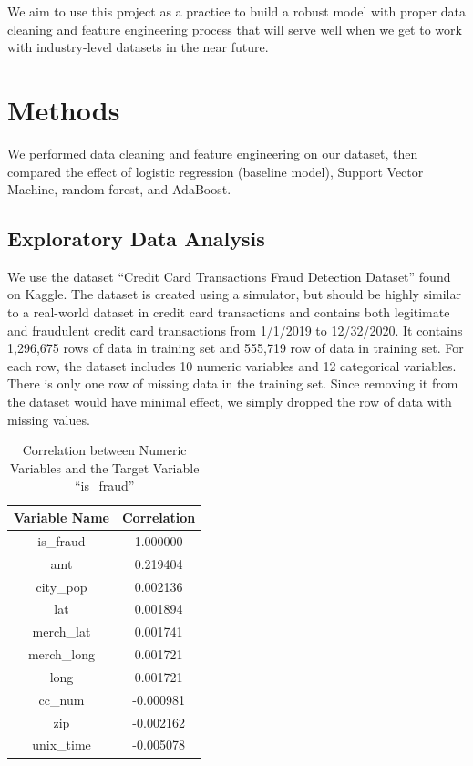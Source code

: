 \documentclass[sigconf, nonacm]{acmart}
\begin{document}
We aim to use this project as a practice to build a robust model with proper data cleaning and feature engineering process that will serve well when we get to work with industry-level datasets in the near future.


\section{Methods}
We performed data cleaning and feature engineering on our dataset, then compared the effect of logistic regression (baseline model), Support Vector Machine, random forest, and AdaBoost.

\subsection{Exploratory Data Analysis}
We use the dataset “Credit Card Transactions Fraud Detection Dataset” \cite{KaggleFraudDetection} found on Kaggle. The dataset is created using a simulator, but should be highly similar to a real-world dataset in credit card transactions and contains both legitimate and fraudulent credit card transactions from 1/1/2019 to 12/32/2020. It contains 1,296,675 rows of data in training set and 555,719 row of data in training set. For each row, the dataset includes 10 numeric variables and 12 categorical variables. There is only one row of missing data in the training set. Since removing it from the dataset would have minimal effect, we simply dropped the row of data with missing values. 


\begin{table}
  \caption{Correlation between Numeric Variables and the Target Variable ``is\_fraud''}
  \label{tab:correlation}
  \begin{tabular}{cc}
    \toprule
        Variable Name&Correlation\\
    \midrule
        is\_fraud& 1.000000\\
        amt& 0.219404\\
        city\_pop& 0.002136\\
        lat&0.001894\\
        merch\_lat&0.001741\\
        merch\_long&0.001721\\
        long&0.001721\\
        cc\_num&-0.000981\\
        zip&-0.002162\\
        unix\_time&-0.005078\\
    \bottomrule
\end{tabular}
\end{table}
\end{document}
